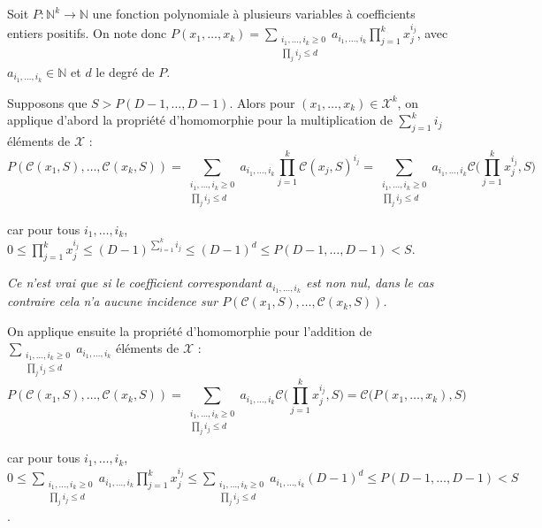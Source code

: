 \documentclass{article}
\begin{document}
Soit $P:\mathbb{N}^k\longrightarrow\mathbb{N}$ une fonction polynomiale à plusieurs variables à coefficients entiers positifs. On note donc $P(x_1, \dots, x_k) = \displaystyle\sum_{\substack{i_1, \dots, i_k \ge 0\\ \prod_j i_j \le d}} a_{i_1, \dots, i_k} \prod_{j=1}^kx_j^{i_j}$, avec $a_{i_1, \dots, i_k} \in \mathbb{N}$ et $d$ le degré de $P$.

Supposons que $S>P(D-1,\dots, D-1)$. Alors pour $(x_1, \dots, x_k)\in\mathcal{X}^k$, on applique d'abord la propriété d'homomorphie pour la multiplication de $\displaystyle\sum_{j=1}^k i_j$ éléments de $\mathcal{X}$ :
\begin{equation}
    P(\mathcal{C}(x_1, S), \dots, \mathcal{C}(x_k, S)) = \displaystyle\sum_{\substack{i_1, \dots, i_k \ge 0\\ \prod_j i_j \le d}} a_{i_1, \dots, i_k} \prod_{j=1}^k\mathcal{C}(x_j, S)^{i_j}=\displaystyle\sum_{\substack{i_1, \dots, i_k \ge 0\\ \prod_j i_j \le d}} a_{i_1, \dots, i_k} \mathcal{C}\Big(\prod_{j=1}^kx_j^{i_j}, S\Big)
\end{equation}

car pour tous $i_1, \dots, i_k$, $0\le\displaystyle\prod_{j=1}^kx_j^{i_j} \le (D-1)^{\sum_{i=1}^k i_j} \le (D-1)^d \le P(D-1,\dots, D-1) < S$.

\textit{Ce n'est vrai que si le coefficient correspondant $a_{i_1, \dots, i_k}$ est non nul, dans le cas contraire cela n'a aucune incidence sur $P(\mathcal{C}(x_1, S), \dots, \mathcal{C}(x_k, S))$.}

On applique ensuite la propriété d'homomorphie pour l'addition de $\displaystyle\sum_{\substack{i_1, \dots, i_k \ge 0\\ \prod_j i_j \le d}} a_{i_1, \dots, i_k}$ éléments de $\mathcal{X}$ :
\begin{equation}
    P(\mathcal{C}(x_1, S), \dots, \mathcal{C}(x_k, S)) = \displaystyle\sum_{\substack{i_1, \dots, i_k \ge 0\\ \prod_j i_j \le d}} a_{i_1, \dots, i_k} \mathcal{C}\Big(\prod_{j=1}^kx_j^{i_j}, S\Big)=\mathcal{C}\Big(P(x_1, \dots, x_k), S\Big)
\end{equation}

car pour tous $i_1, \dots, i_k$, $0\le \displaystyle \sum_{\substack{i_1, \dots, i_k \ge 0\\ \prod_j i_j \le d}} a_{i_1, \dots, i_k} \prod_{j=1}^kx_j^{i_j} \le \displaystyle \sum_{\substack{i_1, \dots, i_k \ge 0\\ \prod_j i_j \le d}} a_{i_1, \dots, i_k} (D-1)^d \le P(D-1,\dots, D-1) < S$.
\end{document}
